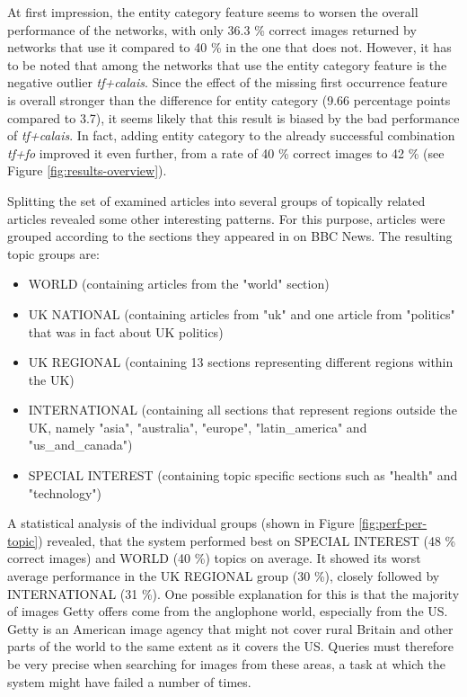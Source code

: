 \documentclass[11pt,a4paper,twoside]{article}
\begin{document}
At first impression, the entity category feature seems to worsen the overall performance of the networks, with only 36.3 \% correct images returned by networks that use it compared to 40 \% in the one that does not. However, it has to be noted that among the networks that use the entity category feature is the negative outlier \emph{tf+calais}. Since the effect of the missing first occurrence feature is overall stronger than the difference for entity category (9.66 percentage points compared to 3.7), it seems likely that this result is biased by the bad performance of \emph{tf+calais}. In fact, adding entity category to the already successful combination \emph{tf+fo} improved it even further, from a rate of 40 \% correct images to 42 \% (see Figure \ref{fig:results-overview}).

\bigskip

Splitting the set of examined articles into several groups of topically related articles revealed some other interesting patterns. For this purpose, articles were grouped according to the sections they appeared in on BBC News. The resulting topic groups are:

\begin{itemize}
    \setlength\itemsep{0em}
    \item WORLD (containing articles from the "world" section)
    \item UK NATIONAL (containing articles from "uk" and one article from "politics" that was in fact about UK politics)
    \item UK REGIONAL (containing 13 sections representing different regions within the UK)
    \item INTERNATIONAL (containing all sections that represent regions outside the UK, namely "asia", "australia", "europe", "latin\_america" and "us\_and\_canada")
    \item SPECIAL INTEREST (containing topic specific sections such as "health" and "technology")
\end{itemize}

A statistical analysis of the individual groups (shown in Figure \ref{fig:perf-per-topic}) revealed, that the system performed best on SPECIAL INTEREST (48 \% correct images) and WORLD (40 \%) topics on average. It showed its worst average performance in the UK REGIONAL group (30 \%), closely followed by INTERNATIONAL (31 \%). One possible explanation for this is that the majority of images Getty offers come from the anglophone world, especially from the US. Getty is an American image agency that might not cover rural Britain and other parts of the world to the same extent as it covers the US. Queries must therefore be very precise when searching for images from these areas, a task at which the system might have failed a number of times.
\end{document}
